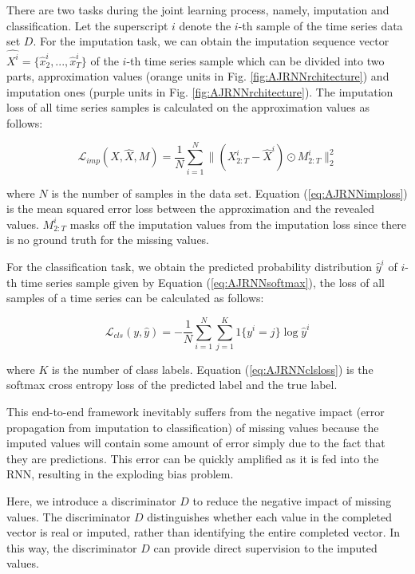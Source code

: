 There are two tasks during the joint learning process, namely, imputation and classification. 
Let the superscript $i$ denote the $i$-th sample of the time series data set $D$.
For the imputation task, we can obtain the imputation sequence vector $\hat{X^i} = \{ \hat{x}^i_2, ..., \hat{x}^i_T \}$ 
of the $i$-th time series sample which can be divided into two parts, approximation values
(orange units in Fig. \ref{fig:AJRNNrchitecture}) and imputation ones (purple units
in Fig. \ref{fig:AJRNNrchitecture}). 
The imputation loss of all time series samples is calculated on the approximation values as follows:

\begin{equation}
  \mathcal{L}_{imp}(X, \hat{X}, M) = \frac{1}{N} \sum_{i=1}^N \lVert (X^i_{2:T} - \hat{X}^i) \odot M^i_{2:T} \rVert_2^2
  \label{eq:AJRNNimploss}
\end{equation}

where $N$ is the number of samples in the data set.
Equation (\ref{eq:AJRNNimploss}) is the mean squared error loss between the approximation and the revealed values.
$ M^i_{2:T}$ masks off the imputation values from the imputation loss since there is no ground truth for the missing values.

For the classification task, we obtain the predicted probability distribution $\hat{y}^i$ of $i$-th time series sample given by
Equation (\ref{eq:AJRNNsoftmax}), the loss of all samples of a time series can be calculated as follows:

\begin{equation}
  \mathcal{L}_{cls}(y, \hat{y}) = - \frac{1}{N} \sum_{i=1}^N \sum_{j=1}^K 1\{ y^i = j\} \log\hat{y}^i 
  \label{eq:AJRNNclsloss}
\end{equation}

where $K$ is the number of class labels. Equation (\ref{eq:AJRNNclsloss}) is the softmax cross entropy loss of the predicted label and the true label.

This end-to-end framework inevitably suffers from the negative impact (error propagation from imputation to classification) of missing values because the imputed values will contain some amount of error simply due to the fact that they are predictions.
This error can be quickly amplified as it is fed into the RNN, resulting in the exploding bias problem.

Here, we introduce a discriminator $D$ to reduce the negative impact of missing values. 
The discriminator $D$ distinguishes whether each value in the completed vector is real or imputed, rather than identifying the entire completed vector. 
In this way, the discriminator $D$ can provide direct supervision to the imputed values.

